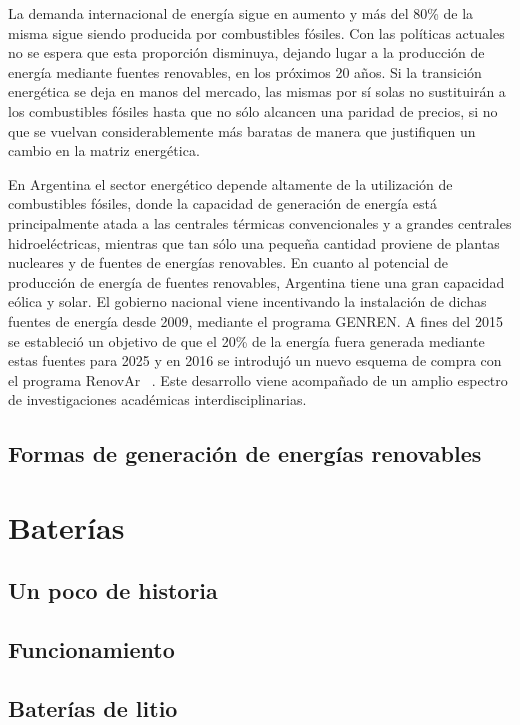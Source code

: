 La demanda internacional de energía sigue en aumento y más del 80\% de la misma
sigue siendo producida por combustibles fósiles. Con las políticas actuales no
se espera que esta proporción disminuya, dejando lugar a la producción de energía 
mediante fuentes renovables, en los próximos 20 años. Si la transición energética 
se deja en manos del mercado, las mismas por sí solas no sustituirán a los 
combustibles fósiles hasta que no sólo alcancen una paridad de precios, si no que 
se vuelvan considerablemente más baratas de manera que justifiquen un cambio en 
la matriz energética. %

En Argentina el sector energético depende altamente de la utilización de 
combustibles fósiles, donde la capacidad de generación de energía está 
principalmente atada a las centrales térmicas convencionales y a grandes 
centrales hidroeléctricas, mientras que tan sólo una pequeña cantidad proviene 
de plantas nucleares y de fuentes de energías renovables. En cuanto al potencial
de producción de energía de fuentes renovables, Argentina tiene una gran 
capacidad eólica y solar. El gobierno nacional viene incentivando la instalación 
de dichas fuentes de energía desde 2009, mediante el programa GENREN. A fines 
del 2015 se estableció un objetivo de que el 20\% de la energía fuera generada
mediante estas fuentes para 2025 y en 2016 se introdujó un nuevo esquema de 
compra con el programa RenovAr ~\cite{schaube2018}. Este desarrollo viene 
acompañado de un amplio espectro de investigaciones académicas 
interdisciplinarias.

\subsection{Formas de generación de energías renovables}

\section{Baterías}

\subsection{Un poco de historia}
\subsection{Funcionamiento}
\subsection{Baterías de litio}

